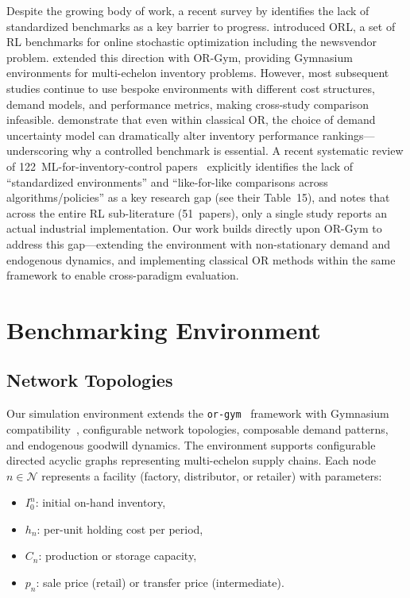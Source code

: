 \documentclass[preprint,12pt]{elsarticle}
\begin{document}
Despite the growing body of work, a recent survey by
\citet{boute2022deep_rl_survey} identifies the lack of standardized
benchmarks as a key barrier to progress. \citet{balaji2019orl} introduced
ORL, a set of RL benchmarks for online stochastic optimization including
the newsvendor problem. \citet{hubbs2020orgym} extended this direction
with OR-Gym, providing Gymnasium environments for multi-echelon inventory
problems. However, most subsequent studies continue to use bespoke
environments with different cost structures, demand models, and performance
metrics, making cross-study comparison infeasible.
\citet{solyali2016impact} demonstrate that even within classical OR,
the choice of demand uncertainty model can dramatically alter inventory
performance rankings---underscoring why a controlled benchmark is
essential.
A recent systematic review of 122~ML-for-inventory-control
papers~\citep{bergsma2025systematic} explicitly identifies the lack of
``standardized environments'' and ``like-for-like comparisons across
algorithms/policies'' as a key research gap (see their Table~15), and
notes that across the entire RL sub-literature (51~papers), only a
single study reports an actual industrial implementation.
Our work builds
directly upon OR-Gym to address this gap---extending the environment with
non-stationary demand and endogenous dynamics, and implementing classical
OR methods within the same framework to enable cross-paradigm evaluation.


\section{Benchmarking Environment}\label{sec:env}

\subsection{Network Topologies}

Our simulation environment extends the
\texttt{or-gym}~\citep{hubbs2020orgym} framework with Gymnasium
compatibility~\citep{raffin2021stable},
configurable network topologies, composable demand patterns, and
endogenous goodwill dynamics. The environment supports configurable
directed acyclic graphs representing
multi-echelon supply chains. Each node $n \in \mathcal{N}$ represents a
facility (factory, distributor, or retailer) with parameters:
\begin{itemize}
  \item $I_0^n$: initial on-hand inventory,
  \item $h_n$: per-unit holding cost per period,
  \item $C_n$: production or storage capacity,
  \item $p_n$: sale price (retail) or transfer price (intermediate).
\end{itemize}
\end{document}
